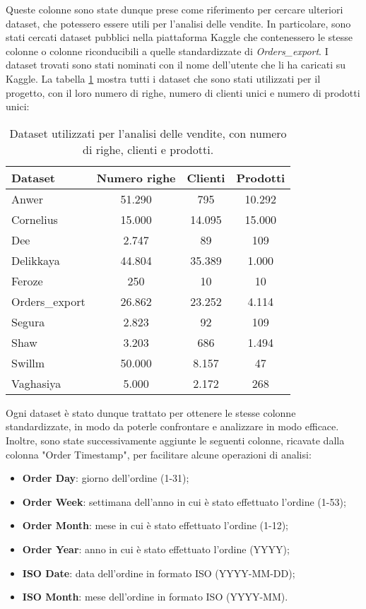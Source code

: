 Queste colonne sono state dunque prese come riferimento per cercare ulteriori dataset, che potessero essere utili per l'analisi delle vendite. In particolare, sono stati cercati dataset pubblici nella piattaforma Kaggle che contenessero le stesse colonne o colonne riconducibili a quelle standardizzate di \emph{Orders\_export}. I dataset trovati sono stati nominati con il nome dell'utente che li ha caricati su Kaggle.
La tabella \ref{tab:dataset-riassunto} mostra tutti i dataset che sono stati utilizzati per il progetto, con il loro numero di righe, numero di clienti unici e numero di prodotti unici:
\begin{table}[h]
    \centering
    \begin{tabular}{lccc}
        \toprule
        \textbf{Dataset} & \textbf{Numero righe} & \textbf{Clienti} & \textbf{Prodotti} \\
        \midrule
        Anwer          & 51.290 & 795   & 10.292 \\
        Cornelius      & 15.000 & 14.095 & 15.000 \\
        Dee            & 2.747  & 89    & 109 \\
        Delikkaya      & 44.804 & 35.389 & 1.000 \\
        Feroze         & 250   & 10    & 10 \\
        Orders\_export & 26.862 & 23.252 & 4.114 \\
        Segura         & 2.823  & 92    & 109 \\
        Shaw           & 3.203  & 686   & 1.494 \\
        Swillm         & 50.000 & 8.157  & 47 \\
        Vaghasiya      & 5.000  & 2.172  & 268 \\
        \bottomrule
    \end{tabular}
    \caption{Dataset utilizzati per l’analisi delle vendite, con numero di righe, clienti e prodotti.}
    \label{tab:dataset-riassunto}
\end{table}

Ogni dataset è stato dunque trattato per ottenere le stesse colonne standardizzate, in modo da poterle confrontare e analizzare in modo efficace.
Inoltre, sono state successivamente aggiunte le seguenti colonne, ricavate dalla colonna "Order Timestamp", per facilitare alcune operazioni di analisi:
\begin{itemize}
    \item \textbf{Order Day}: giorno dell'ordine (1-31);
    \item \textbf{Order Week}: settimana dell'anno in cui è stato effettuato l'ordine (1-53);
    \item \textbf{Order Month}: mese in cui è stato effettuato l'ordine (1-12);
    \item \textbf{Order Year}: anno in cui è stato effettuato l'ordine (YYYY);
    \item \textbf{ISO Date}: data dell'ordine in formato ISO (YYYY-MM-DD);
    \item \textbf{ISO Month}: mese dell'ordine in formato ISO (YYYY-MM).
\end{itemize}

